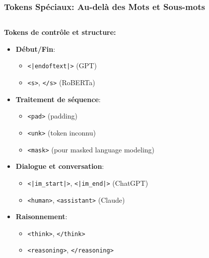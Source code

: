 \documentclass[aspectratio=169,11pt]{beamer}
\begin{document}
\begin{frame}
    \frametitle{Tokens Spéciaux: Au-delà des Mots et Sous-mots}
    
    \begin{columns}[T]
        \begin{column}{0.5\textwidth}
            \textbf{Tokens de contrôle et structure:}
            \begin{itemize}
                \item \textbf{Début/Fin}:
                \begin{itemize}
                    \item \texttt{<|endoftext|>} (GPT)
                    \item \texttt{<s>}, \texttt{</s>} (RoBERTa)
                \end{itemize}
                \vspace{0.1cm}
                \item \textbf{Traitement de séquence}:
                \begin{itemize}
                    \item \texttt{<pad>} (padding)
                    \item \texttt{<unk>} (token inconnu)
                    \item \texttt{<mask>} (pour masked language modeling)
                \end{itemize}
                \vspace{0.1cm}
                \item \textbf{Dialogue et conversation}:
                \begin{itemize}
                    \item \texttt{<|im\_start|>}, \texttt{<|im\_end|>} (ChatGPT)
                    \item \texttt{<human>}, \texttt{<assistant>} (Claude)
                \end{itemize}
                \vspace{0.1cm}
                \item \textbf{Raisonnement}:
                \begin{itemize}
                    \item \texttt{<think>}, \texttt{</think>}
                    \item \texttt{<reasoning>}, \texttt{</reasoning>}
                \end{itemize}
            \end{itemize}
        \end{column}
        

\end{columns}
\end{frame}
\end{document}
